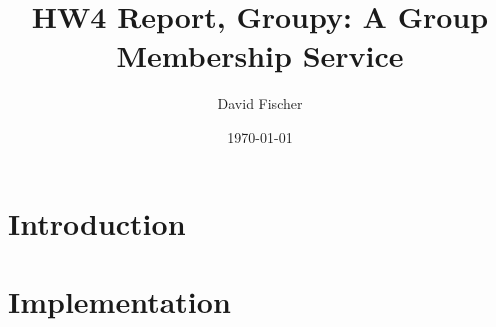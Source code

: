 \documentclass[a4paper, 11pt]{article}
\title{HW4 Report, Groupy: A Group Membership Service}
\author{David Fischer}
\date{\today{}}
\begin{document}
\maketitle

\section{Introduction}


\section{Implementation}


\subsection{}


\subsection{}


\subsection{}



\subsection{}

\end{document}
